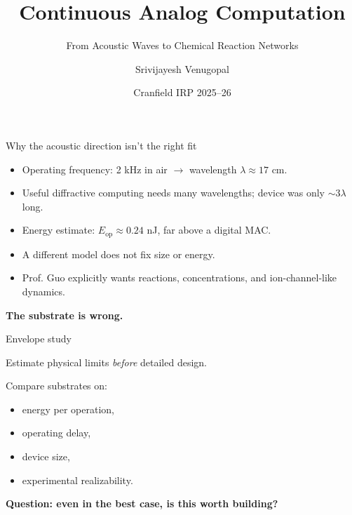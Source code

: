 \documentclass[aspectratio=169,11pt]{beamer}
\title{Continuous Analog Computation}
\subtitle{From Acoustic Waves to Chemical Reaction Networks}
\author{Srivijayesh Venugopal}
\date{Cranfield IRP 2025--26}
\begin{document}
\begin{frame}
\titlepage
\end{frame}

\begin{frame}{Why the acoustic direction isn't the right fit}

\begin{itemize}
    \item Operating frequency: 2 kHz in air $\rightarrow$ wavelength $\lambda \approx 17$ cm.
    \item Useful diffractive computing needs many wavelengths; device was only $\sim 3\lambda$ long.
    \item Energy estimate: $E_{\text{op}} \approx 0.24$ nJ, far above a digital MAC.
    \item A different model does not fix size or energy.
    \item Prof. Guo explicitly wants reactions, concentrations, and ion-channel-like dynamics.
\end{itemize}

\vspace{0.5cm}
\centering
\textbf{The substrate is wrong.}

\end{frame}

\begin{frame}{Envelope study}

Estimate physical limits \textit{before} detailed design.

\vspace{0.3cm}
Compare substrates on:
\begin{itemize}
    \item energy per operation,
    \item operating delay,
    \item device size,
    \item experimental realizability.
\end{itemize}

\vspace{0.3cm}
\centering
\textbf{Question: even in the best case, is this worth building?}

\end{frame}
\end{document}
